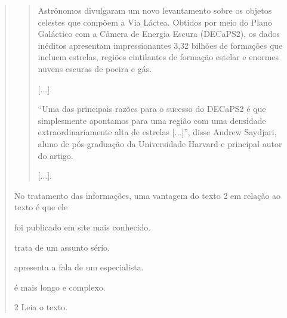 \begin{quote}
\begin{quote}
Astrônomos divulgaram um novo levantamento sobre os objetos celestes
que compõem a Via Láctea. Obtidos por meio do Plano Galáctico com a
Câmera de Energia Escura (DECaPS2), os dados inéditos apresentam
impressionantes 3,32 bilhões de formações que incluem estrelas, regiões
cintilantes de formação estelar e enormes nuvens escuras de poeira e
gás.

{[}...{]}

“Uma das principais razões para o sucesso do DECaPS2 é que simplesmente
apontamos para uma região com uma densidade extraordinariamente alta de
estrelas {[}...{]}”, disse Andrew Saydjari, aluno de pós-graduação da
Universidade Harvard e principal autor do artigo.

{[}...{]}.

\end{quote}

No tratamento das informações, uma vantagem do texto 2 em relação ao texto é que ele

\begin{escolha}
\item foi publicado em site mais conhecido.

\item trata de um assunto sério.

\item apresenta a fala de um especialista.

\item é mais longo e complexo.
\end{escolha}


\num{2} Leia o texto.


\end{quote}
